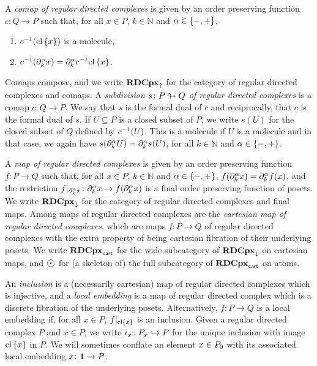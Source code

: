 A \emph{comap of regular directed complexes} is given by an order preserving function \( c \colon Q \to P \) such that, for all \( x \in P \), \( k \in \mathbb{N} \) and \( \a \in \set{-, +} \), 
\begin{enumerate}
    \item \( \invrs{c}(\clset{x}) \) is a molecule, 
    \item \( \invrs{c}(\bd{k}{\a} x) = \bd{k}{\a} \invrs{c}\clset{x} \).
\end{enumerate}
Comaps compose, and we write \( \rdcpxcomap \) for the category of regular directed complexes and comaps.
A \emph{subdivision \( s \colon P \sd Q \) of regular directed complexes} is a comap \( c \colon Q \to P \).
We say that \( s \) is the formal dual of \( c \) and reciprocally, that \( c \) is the formal dual of \( s \).
If \( U \subseteq P \) is a closed subset of \( P \), we write \( s(U) \) for the closed subset of \( Q \) defined by \( \invrs{c}(U) \).
This is a molecule if \( U \) is a molecule and in that case, we again have \( s(\bd{k}{\a} U) = \bd{k}{\a} s(U) \), for all \( k \in \mathbb{N} \) and \( \a \in \set{-, +} \).

A \emph{map of regular directed complexes} is given by an order preserving function \( f \colon P \to Q \) such that, for all \( x \in P \), \( k \in \mathbb{N} \) and \( \a \in \set{-, +} \), \( f(\bd{k}{\a}x) = \bd{k}{\a} f(x) \), and the restriction \( \restr{f}{\bd{k}{\a} x} \colon \bd{k}{\a} x \to f(\bd{k}{\a} x) \) is a final order preserving function of posets. 
We write \( \rdcpxmap \) for the category of regular directed complexes and final maps.
Among maps of regular directed complexes are the \emph{cartesian map of regular directed complexes}, which are maps \( f \colon P \to Q \) of regular directed complexes with the extra property of being cartesian fibration of their underlying posets.
We write \( \rdcpxcart \) for the wide subcategory of \( \rdcpxmap \) on cartesian maps, and \( \atom \) for (a skeleton of) the full subcategory of \( \rdcpxcart \) on atoms.

An \emph{inclusion} is a (necessarily cartesian) map of regular directed complexes which is injective, and a \emph{local embedding} is a map of regular directed complex which is a discrete fibration of the underlying posets.
Alternatively, \( f \colon P \to Q \) is a local embedding if, for all \( x \in P \), \( \restr{f}{\clset{x}} \) is an inclusion.
Given a regular directed complex \( P \) and \( x \in P \), we write \( \mapel{x} \colon \imel{P}{x} \incl P \) for the unique inclusion with image \( \clset{x} \) in \( P \).
We will sometimes conflate an element \( x \in \gr{0}{P} \) with its associated local embedding \( x \colon \pt \to P \).

